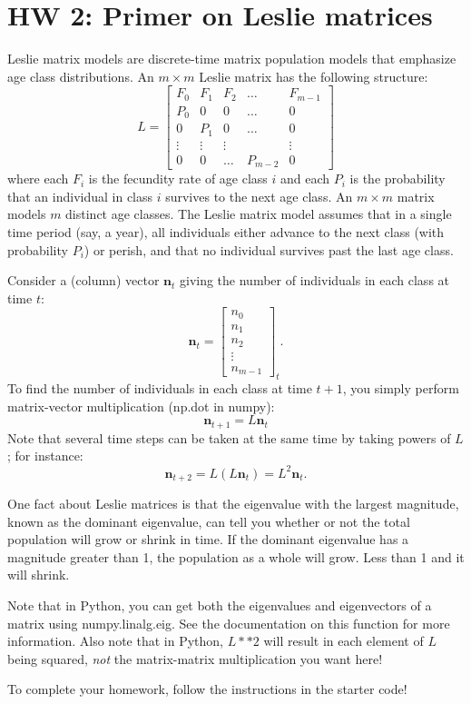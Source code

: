 \documentclass[11pt]{article}
\begin{document}
\section*{HW 2: Primer on Leslie matrices}

Leslie matrix models are discrete-time matrix population models that emphasize age class distributions. An $m\times m$ Leslie matrix has the following structure:
\[L =
\left[\begin{array}{ccccc}
F_0 & F_1 & F_2 & \ldots & F_{m-1} \\ 
P_0 & 0 & 0 &\ldots  & 0 \\ 
0 & P_1 & 0 & \ldots & 0 \\ 
\vdots & \vdots & \vdots & \  & \vdots \\ 
0 & 0 & \ldots & P_{m-2} & 0
\end{array}\right]
\]
where each $F_i$ is the fecundity rate of age class $i$ and each $P_i$ is the probability that an individual in class $i$ survives to the next age class. An $m\times m$ matrix models $m$ distinct age classes. The Leslie matrix model assumes that in a single time period (say, a year), all individuals either advance to the next class (with probability $P_i$) or perish, and that no individual survives past the last age class.

Consider a (column) vector $\mathbf{n}_t$ giving the number of individuals in each class at time $t$:
\[
\mathbf{n}_t = \left[\begin{array}{c}
n_0\\ 
n_1\\ 
n_2\\ 
\vdots\\ 
n_{m-1}
\end{array} \right]_t.
\]
To find the number of individuals in each class at time $t+1$, you simply perform matrix-vector multiplication (np.dot in numpy):
\[
\mathbf{n}_{t+1} = L\mathbf{n}_t
\]
Note that several time steps can be taken at the same time by taking powers of $L$; for instance:
\[
\mathbf{n}_{t+2} = L(L\mathbf{n}_t) = L^2\mathbf{n}_t.
\]

One fact about Leslie matrices is that the eigenvalue with the largest magnitude, known as the dominant eigenvalue, can tell you whether or not the total population will grow or shrink in time. If the dominant eigenvalue has a magnitude greater than 1, the population as a whole will grow. Less than 1 and it will shrink.

Note that in Python, you can get both the eigenvalues and eigenvectors of a matrix using numpy.linalg.eig. See the documentation on this function for more information. Also note that in Python, $L**2$ will result in each element of $L$ being squared, \textit{not} the matrix-matrix multiplication you want here!

To complete your homework, follow the instructions in the starter code!
\end{document}
